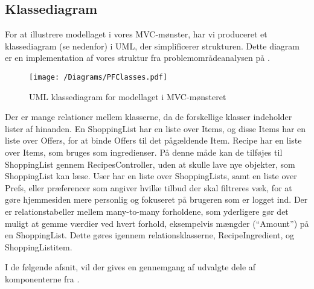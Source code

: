 \subsection{Klassediagram}
For at illustrere modellaget i vores MVC-mønster, har vi produceret et klassediagram (se  nedenfor) i UML, der simplificerer strukturen. 
Dette diagram er en implementation af vores struktur fra problemområdeanalysen på .

\begin{figure}[h]
\centering
 \texttt{[image: /Diagrams/PFClasses.pdf]}
\caption{UML klassediagram for modellaget i MVC-mønsteret}\label{diagram:klassediagram}
\end{figure}

Der er mange relationer mellem klasserne, da de forskellige klasser indeholder lister af hinanden.
En ShoppingList har en liste over Items, og disse Items har en liste over Offers, for at binde Offers til det pågældende Item.
Recipe har en liste over Items, som bruges som ingredienser.
På denne måde kan de tilføjes til ShoppingList gennem RecipesController, uden at skulle lave nye objekter, som ShoppingList kan læse.
User har en liste over ShoppingLists, samt en liste over Prefs, eller præferencer som angiver hvilke tilbud der skal filtreres væk, for at gøre hjemmesiden mere personlig og fokuseret på brugeren som er logget ind.
Der er relationstabeller mellem many-to-many forholdene, som yderligere gør det muligt at gemme værdier ved hvert forhold, eksempelvis mængder (``Amount'') på en ShoppingList.
Dette gøres igennem relationsklasserne, Recipe\textunderscore Ingredient, og ShoppingList\textunderscore item.

I de følgende afsnit, vil der gives en gennemgang af udvalgte dele af komponenterne fra .
